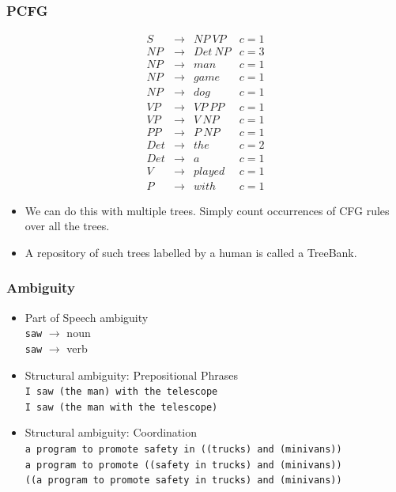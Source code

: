 \begin{frame}
\frametitle{PCFG}
{\small
\[
\begin{array}{cccc}
 S & \rightarrow & NP~VP  & c=1  \\
 NP & \rightarrow & Det~NP & c=3  \\
 NP & \rightarrow & man  & c=1   \\
 NP & \rightarrow & game  & c=1   \\
 NP & \rightarrow & dog  & c=1   \\
 VP & \rightarrow & VP~PP  & c=1  \\
 VP & \rightarrow & V~NP  & c=1  \\
 PP & \rightarrow & P~NP  & c=1  \\
 Det & \rightarrow & the  & c=2  \\
 Det & \rightarrow & a  & c=1   \\
 V & \rightarrow & played & c=1  \\
 P & \rightarrow & with & c=1 
\end{array}
\] 
}
\begin{itemize}
\item We can do this with multiple trees. Simply count occurrences of CFG rules over all the trees. 
\item A repository of such trees labelled by a human is called a TreeBank.
\end{itemize}
\end{frame}

\begin{frame}
\frametitle{Ambiguity}
\begin{itemize}
  \item Part of Speech ambiguity\\
        {\tt saw} $\rightarrow$ {\color{red}noun}\\
        {\tt saw} $\rightarrow$ {\color{red}verb}
  \item Structural ambiguity: Prepositional Phrases\\
        {\tt I saw (the man) with the telescope}\\
        {\tt I saw (the man with the telescope)}
  \item Structural ambiguity: Coordination\\
        {\tt a program to promote safety in ((trucks) and (minivans))}\\
        {\tt a program to promote ((safety in trucks) and (minivans))}\\
        {\tt ((a program to promote safety in trucks) and (minivans))}
\end{itemize}

\end{frame}


